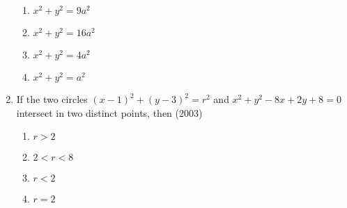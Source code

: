 \documentclass[journal,12pt,twocolumn]{IEEEtran}
\theoremstyle{remark}
\begin{document}
\begin{enumerate}
\begin{enumerate}
\item$x^2+y^2=9a^2$\\
\item$x^2+y^2=16a^2$\\
\item$x^2+y^2=4a^2$\\
\item$x^2+y^2=a^2$\\
\end{enumerate}
\item If the two circles $(x-1)^2+(y-3)^2=r^2$ and $x^2+y^2-8x+2y+8=0$ intersect in two distinct points, then \hfill(2003)\\
\begin{enumerate}
\item$r>2$\\
\item$2<r<8$\\
\item$r<2$\\
\item$r=2$
\end{enumerate}
\end{enumerate}
\end{document}
